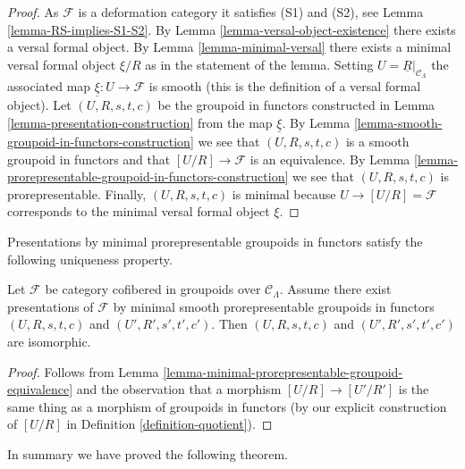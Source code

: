 \begin{proof}
As $\mathcal{F}$ is a deformation category it satisfies (S1) and (S2), see
Lemma \ref{lemma-RS-implies-S1-S2}.
By
Lemma \ref{lemma-versal-object-existence}
there exists a versal formal object. By
Lemma \ref{lemma-minimal-versal}
there exists a minimal versal formal object $\xi/R$ as in the statement
of the lemma. Setting
$U = \underline{R}|_{\mathcal{C}_\Lambda}$ the
associated map $\underline{\xi} : U \to \mathcal{F}$ is smooth (this is
the definition of a versal formal object).
Let $(U, R, s, t, c)$ be the groupoid in functors constructed in
Lemma \ref{lemma-presentation-construction}
from the map $\underline{\xi}$. By
Lemma \ref{lemma-smooth-groupoid-in-functors-construction}
we see that $(U, R, s, t, c)$ is a smooth groupoid in functors and that
$[U/R] \to \mathcal{F}$ is an equivalence. By
Lemma \ref{lemma-prorepresentable-groupoid-in-functors-construction}
we see that $(U, R, s, t, c)$ is prorepresentable.
Finally, $(U, R, s, t, c)$ is minimal because $U \to [U/R] = \mathcal{F}$
corresponds to the minimal versal formal object $\xi$.
\end{proof}

\noindent
Presentations by minimal prorepresentable groupoids in functors satisfy the
following uniqueness property.

\begin{lemma}
\label{lemma-minimal-presentations-equivalent}
Let $\mathcal{F}$ be category cofibered in groupoids over
$\mathcal{C}_\Lambda$. Assume there exist presentations of
$\mathcal{F}$ by minimal smooth prorepresentable groupoids
in functors $(U, R, s, t, c)$ and $(U', R', s', t', c')$.
Then $(U, R, s, t, c)$ and $(U', R', s', t', c')$ are isomorphic.
\end{lemma}

\begin{proof}
Follows from
Lemma \ref{lemma-minimal-prorepresentable-groupoid-equivalence}
and the observation that a morphism
$[U/R] \to [U'/R']$ is the same thing as a morphism
of groupoids in functors (by our explicit construction of $[U/R]$ in
Definition \ref{definition-quotient}).
\end{proof}

\noindent
In summary we have proved the following theorem.


